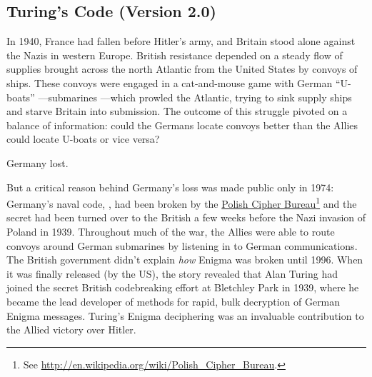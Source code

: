 \subsection{Turing's Code (Version 2.0)}

In 1940, France had fallen before Hitler's army, and Britain stood alone against the Nazis
in western Europe.  British resistance depended on a steady flow of supplies brought across
the north Atlantic from the United States by convoys of ships.  These convoys were engaged
in a cat-and-mouse game with German ``U-boats'' ---submarines ---which prowled the
Atlantic, trying to sink supply ships and starve Britain into submission.  The outcome of
this struggle pivoted on a balance of information: could the Germans locate convoys better
than the Allies could locate U-boats or vice versa?

Germany lost.

But a critical reason behind Germany's loss was made public only in 1974: Germany's naval
code, , had been broken by the
\href{http://en.wikipedia.org/wiki/Polish_Cipher_Bureau}{Polish Cipher Bureau}\footnote{See
  \url{http://en.wikipedia.org/wiki/Polish\_Cipher\_Bureau}.} and the secret had been
turned over to the British a few weeks before the Nazi invasion of Poland in 1939.
Throughout much of the war, the Allies were able to route convoys around German submarines
by listening in to German communications.  The British government didn't explain \emph{how}
Enigma was broken until 1996.  When it was finally released (by the US), the story revealed
that Alan Turing had joined the secret British codebreaking effort at Bletchley Park in
1939, where he became the lead developer of methods for rapid, bulk decryption of German
Enigma messages.  Turing's Enigma deciphering was an invaluable contribution to the Allied
victory over Hitler.

